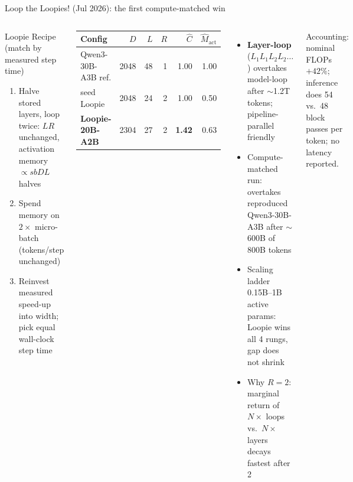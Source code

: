 \documentclass[aspectratio=169,10pt]{beamer}
\newcommand{\con}[1]{\textcolor{negative}{#1}}
\newcommand{\HL}[1]{\textcolor{emphasis}{#1}}
\begin{document}
\begin{frame}{Loop the Loopies! (Jul 2026): the first compute-matched win}
  \begin{columns}[T]
      \begin{block}{Loopie Recipe (match by measured step time)}
        \begin{enumerate}
          \item Halve stored layers, loop twice: $LR$ unchanged, activation memory $\propto sbDL$ halves
          \item Spend memory on $2\times$ micro-batch (tokens/step unchanged)
          \item Reinvest measured speed-up into width; pick equal wall-clock step time
        \end{enumerate}
      \end{block}
      \begin{center}
      \small
      \begin{tabular}{@{}lrrrrr@{}}
        \toprule
        Config & $D$ & $L$ & $R$ & $\hat C$ & $\hat M_{\mathrm{act}}$ \\
        \midrule
        Qwen3-30B-A3B ref. & 2048 & 48 & 1 & 1.00 & 1.00 \\
        seed Loopie & 2048 & 24 & 2 & 1.00 & 0.50 \\
        \rowcolor{positive!12} \textbf{Loopie-20B-A2B} & 2304 & 27 & 2 & \textbf{1.42} & 0.63 \\
        \bottomrule
      \end{tabular}
      \end{center}
      \begin{itemize}
        \item \textbf{Layer-loop} ($L_1L_1L_2L_2\dots$) overtakes model-loop after $\sim$1.2T tokens; pipeline-parallel friendly
        \item Compute-matched run: overtakes reproduced Qwen3-30B-A3B after \HL{$\sim$600B of 800B tokens}
        \item Scaling ladder 0.15B--1B active params: Loopie wins all 4 rungs, gap does not shrink
        \item Why $R{=}2$: marginal return of $N\times$ loops vs.\ $N\times$ layers decays fastest after 2
      \end{itemize}
      \con{Accounting:} nominal FLOPs $+42\%$; inference does 54 vs.\ 48 block passes per token; no latency reported.
  \end{columns}
\end{frame}
\end{document}
